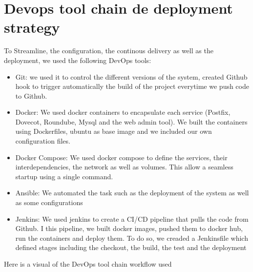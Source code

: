 \documentclass[12pt]{article}
\begin{document}
\section{Devops tool chain de deployment strategy}
To Streamline, the configuration, the continous delivery as well as the deployment, we used the following DevOps tools: 
\begin{itemize}
    \item Git: we used it to control the different versions of the system, created Github hook to trigger automatically the build of the project everytime we push code to Github.
    \item Docker: We used docker containers to encapsulate each service (Postfix, Dovecot, Roundube, Mysql and the web admin tool). We built the containers using Dockerfiles, ubuntu as base image and we included our own configuration files.
    \item Docker Compose: We used docker compose to define the services, their interdependencies, the network as well as volumes. This allow a seamless startup using a single command.
    \item Ansible: We automated the task such as the deployment of the system as well as some configurations
    \item Jenkins: We used jenkins to create a CI/CD pipeline that pulls the code from Github. I this pipeline, we built docker images, pushed them to docker hub, run the containers and deploy them. To do so, we creaded a Jenkinsfile which defined stages including the checkout, the build, the test and the deployment
\end{itemize}
Here is a visual of the DevOps tool chain workflow used 
\end{document}
